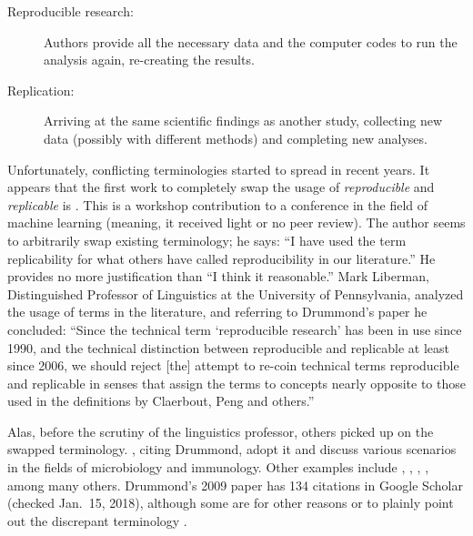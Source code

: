 \documentclass{statement}
\newlength{\up}
\begin{document}
\begin{description}
\item[Reproducible research:] Authors provide all the necessary data and the computer codes to run the analysis again, re-creating the results.
\item[Replication:] Arriving at the same scientific findings as another study, collecting new data (possibly with different methods) and completing new analyses.
\end{description}

Unfortunately, conflicting terminologies started to spread in recent years. 
It appears that the first work to completely swap the usage of \emph{reproducible} and \emph{replicable} is \cite{drummond2009}. 
This is a workshop contribution to a conference in the field of machine learning (meaning, it received light or no peer review). 
The author seems to arbitrarily swap existing terminology; he says: ``I have used the term replicability for what others have called reproducibility in our literature.''
He provides no more justification than ``I think it reasonable.''
Mark Liberman, Distinguished Professor of Linguistics at the University of Pennsylvania, analyzed the usage of terms in the literature, and referring to Drummond's paper he concluded: ``Since the technical term `reproducible research' has been in use since 1990, and the technical distinction between reproducible and replicable at least since 2006, we should reject [the] attempt to re-coin technical terms reproducible and replicable in senses that assign the terms to concepts nearly opposite to those used in the definitions by Claerbout, Peng and others.'' \cite[]{liberman2015}

Alas, before the scrutiny of the linguistics professor, others picked up on the swapped terminology. 
\cite{casadevall_fang2010}, citing Drummond, adopt it and discuss various scenarios in the fields of microbiology and immunology. 
Other examples include \cite{davison2012}, \cite{loscalzo2012}, \cite{crook2013}, \cite{cooper2015}, among many others. 
Drummond's 2009 paper has 134 citations in Google Scholar (checked Jan.\ 15, 2018), although some are for other reasons \cite[]{dewinter_happee2013} or to plainly point out the discrepant terminology \cite[]{boylan2015}.
\end{document}
